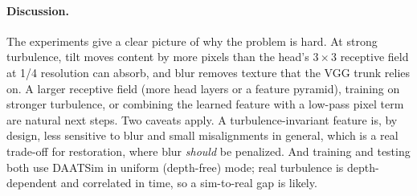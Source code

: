 \paragraph{Discussion.}
The experiments give a clear picture of why the problem is hard.
At strong turbulence, tilt moves content by more pixels than the head's $3\times3$ receptive field at 1/4 resolution can absorb, and blur removes texture that the VGG trunk relies on.
A larger receptive field (more head layers or a feature pyramid), training on stronger turbulence, or combining the learned feature with a low-pass pixel term are natural next steps.
Two caveats apply.
A turbulence-invariant feature is, by design, less sensitive to blur and small misalignments in general, which is a real trade-off for restoration, where blur \emph{should} be penalized.
And training and testing both use DAATSim in uniform (depth-free) mode; real turbulence is depth-dependent and correlated in time, so a sim-to-real gap is likely.
